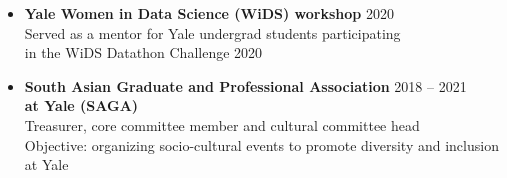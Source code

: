 \documentclass[letterpaper,12pt,oneside]{article}
\theoremstyle{definition}
\begin{document}
\begin{itemize}
				\item[] {\bf Yale Women in Data Science (WiDS) workshop} \hfill 2020\\
				Served as a mentor for Yale undergrad students participating \\
				in the
				{WiDS Datathon Challenge 2020}
				
				\item[] {\bf South Asian Graduate and Professional Association} \hfill 2018 -- 2021\\
				{\bf at Yale (SAGA)}\\
				Treasurer, core committee member and cultural committee head\\
				Objective: organizing socio-cultural events to promote diversity and inclusion at Yale
				
				
			\end{itemize}
			
			\vfill
			
\end{document}
